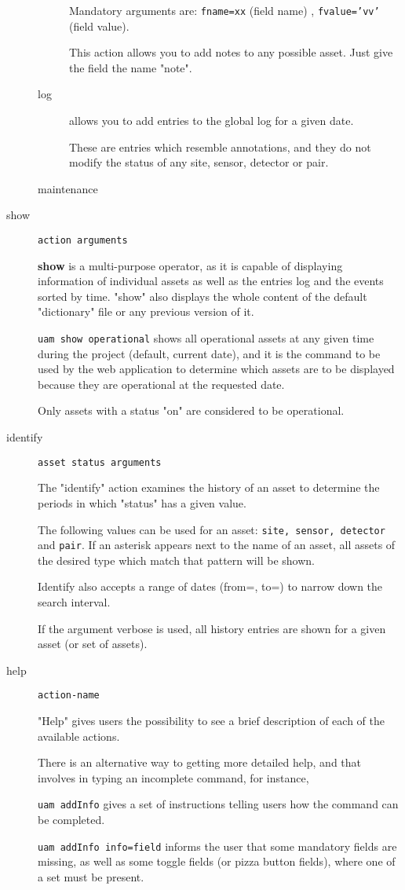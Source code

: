 \documentclass[12pt]{amsart}
\begin{document}
\begin{description}
\begin{description}
Mandatory arguments are: {\tt fname=xx} (field name) , {\tt fvalue='vv'} (field value).

This action allows you to add notes to any possible asset. Just give the field the name "note".

\item[log] allows you to add entries to the global log for a given date.

These are entries which resemble annotations, and they do not modify the status of any site, sensor, detector or pair.

\item[maintenance]

\end{description}

\item[show] {\tt action arguments}

{\bf show} is a multi-purpose operator, as it is capable of displaying information of individual assets as well as the entries log and the events sorted by time. "show" also displays the whole content of the default "dictionary" file or any previous version of it. 

{\tt uam show operational} shows all operational assets at any given time during the project (default, current date), and it is the command to be used by the web application to determine which assets are to be displayed because they are operational at the requested date.

Only assets with a status "on" are considered to be operational.

\item[identify]{\tt asset status arguments}

The "identify" action examines the history of an asset to determine the periods in which "status" has a given value.

The following values can be used for an asset: {\tt site, sensor, detector} and {\tt pair}.  If an asterisk appears next to the name of an asset, all assets of the desired type which match that pattern will be shown.

Identify also accepts a range of dates (from=, to=) to narrow down the search interval.

If the argument verbose is used, all history entries are shown for a given asset (or set of assets).

\item[help] {\tt action-name}

"Help" gives users the possibility to see a brief description of each of the available actions.

There is an alternative way to getting more detailed help, and that involves in typing an incomplete command, for instance,

{\tt uam addInfo} gives a set of instructions telling users how the command can be completed.

{\tt uam addInfo info=field}  informs the user that some mandatory fields are missing, as well as some toggle fields (or pizza button fields), where one of a set must be present.

\end{description}
\end{document}
